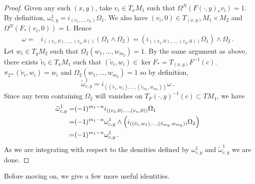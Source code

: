 \begin{proof}
Given any such $(x,y)$, take $v_i\in T_xM_1$ such that $\Omega^N(F(\cdot,y)_*v_i)=1$.  By definition, $\omega_{c,y}^1=i_{(v_1,...,v_n)}\Omega_1$.  We also have $(v_i,0)\in T_{(x,y)}M_1\times M_2$ and $\Omega^N(F_*(v_i,0))=1$.  Hence 
\begin{align}
\omega=&i_{((v_1,0),...,(v_n,0))}(\Omega_1\wedge\Omega_2)
=(i_{((v_1,0),...,(v_n,0))}\Omega_1)\wedge\Omega_2\,.
\end{align}
Let $w_i\in T_y M_2$ such that $\Omega_2(w_1,...,w_{m_2})=1$.  By the same argument as above, there exists $\tilde{v}_i\in T_xM_1$ such that $(\tilde{v}_i,w_i)\in \ker F_*=T_{(x,y)}F^{-1}(c)$.  $\pi_{2*}(\tilde{v}_i,w_i)=w_i$ and $\Omega_2(w_1,...,w_{m_2})=1$ so by definition,
\begin{equation}
\tilde{\omega}_{c,y}^1=i_{((\tilde{v}_1,w_1),...,(\tilde{v}_{m_2},w_{m_2}))}\omega\,.
\end{equation}
Since any term containing $\Omega_2$ will vanishes on $T_F(\cdot,y)^{-1}(c)\subset T M_1$, we have  
\begin{align}
\tilde{\omega}_{c,y}^1=&(-1)^{m_1-n}i_{((v_1,0),...,(v_n,0))}\Omega_1\\
=&(-1)^{m_1-n}\omega_{c,y}^1\wedge\left(i_{((\tilde{v}_1,w_1),...,(\tilde{v}_{m_2},w_{m_2}))}\Omega_2\right)\notag\\
=&(-1)^{m_1-n}\omega_{c,y}^1\,.\notag
\end{align}
As we are integrating with respect to the densities defined by $\omega_{c,y}^1$ and $\tilde{\omega}_{c,y}^1$ we are done.  
\end{proof}

Before moving on, we give a few more useful identities.

